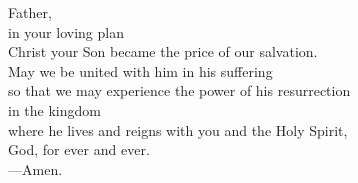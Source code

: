 \prayer


\begin{prayerverse}
Father,\\
in your loving plan\\
Christ your Son became the price of our salvation.\\
May we be united with him in his suffering\\
so that we may experience the power of his resurrection\\
in the kingdom\\
where he lives and reigns with you and the Holy Spirit,\\
God, for ever and ever.\\
{\color{red}---\thinspace}Amen.
\end{prayerverse}

